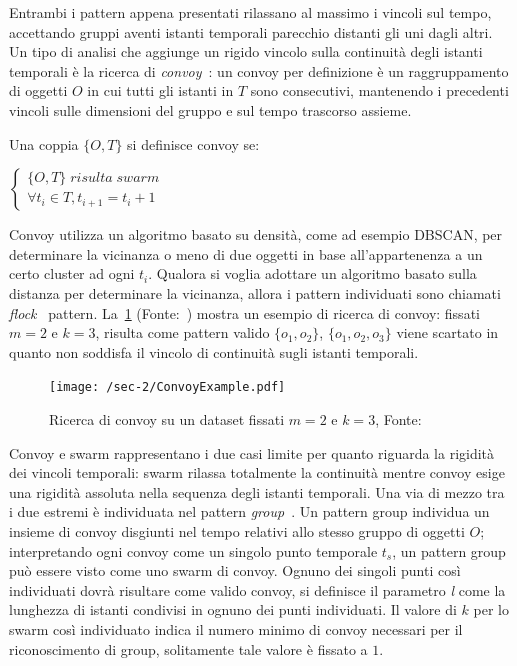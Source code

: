 Entrambi i pattern appena presentati rilassano al massimo i vincoli sul tempo,
accettando gruppi aventi istanti temporali parecchio distanti gli uni dagli altri.
Un tipo di analisi che aggiunge un rigido vincolo sulla continuità degli istanti temporali è
la ricerca di \textit{convoy}~\cite{jeung2008convoy}: un convoy per definizione è un raggruppamento di oggetti \(O\) in cui
tutti gli istanti in \(T\) sono consecutivi, mantenendo i precedenti vincoli sulle dimensioni del
gruppo e sul tempo trascorso assieme.

\begin{definition}[Convoy]\label{definition:convoy}
  Una coppia \( \{ O, T \} \) si definisce convoy se:
  \begin{center}
    \(
      \begin{cases}
         \{ O, T \} \; risulta \; swarm   \\
      \forall t_{i} \in T, t_{i+1} = t_{i} + 1
      \end{cases}
    \)

  \end{center}
\end{definition}

Convoy utilizza un algoritmo basato su densità, come ad esempio DBSCAN, per determinare
la vicinanza o meno di due oggetti in base all'appartenenza a un certo cluster ad ogni
\(t_{i}\).
Qualora si voglia adottare un algoritmo basato sulla distanza per determinare la vicinanza, allora i
pattern individuati sono chiamati \textit{flock}~\cite{benkert2008reporting} pattern.
La~\cref{fig:chap-1:ConvoyExample} (Fonte:~\cite{phan2016all}) mostra un esempio di ricerca di convoy: fissati \(m=2\)
e \(k=3\), risulta come pattern valido \( \{ o_{1}, o_{2}\} \),
\( \{ o_{1}, o_{2}, o_{3}\} \) viene scartato in quanto non soddisfa il vincolo di continuità
sugli istanti temporali.

\begin{figure}
  \centering
  \texttt{[image: /sec-2/ConvoyExample.pdf]}
  \caption{Ricerca di convoy su un dataset fissati \(m=2\) e \(k=3\), Fonte:\cite{DBLP:journals/ijitdm/PhanPT16}}%
  \label{fig:chap-1:ConvoyExample}
\end{figure}

Convoy e swarm rappresentano i due casi limite per quanto riguarda la rigidità dei vincoli temporali:
swarm rilassa totalmente la continuità mentre convoy esige una rigidità assoluta nella sequenza
degli istanti temporali.
Una via di mezzo tra i due estremi è individuata nel pattern \textit{group}~\cite{wang2006efficient}.
Un pattern group individua un insieme di convoy disgiunti nel tempo relativi allo stesso gruppo di oggetti \(O\);
interpretando ogni convoy come un singolo punto temporale \(t_{s}\), un pattern group può essere visto come uno swarm
di convoy.
Ognuno dei singoli punti così individuati dovrà risultare come valido convoy, si definisce
il parametro \textit{l} come la lunghezza di istanti condivisi in ognuno dei punti individuati.
Il valore di \(k\) per lo swarm così individuato indica il numero minimo di convoy necessari per il riconoscimento di group,
solitamente tale valore è fissato a \(1\).

